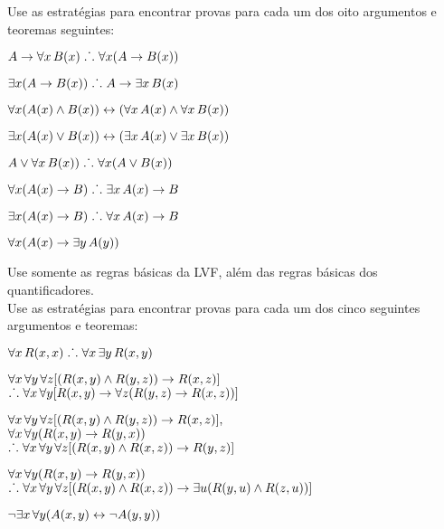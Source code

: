 \practiceproblems

\problempart
Use as estratégias  para encontrar provas para cada um dos oito argumentos e teoremas seguintes:
 
\begin{earg}
\item $A \rightarrow \forall x\,\mathord{B}(x) \mathrel{\ldotp\dot{}\,\ldotp} \forall x(A \rightarrow \mathord{B}(x))$
\item $\exists x(A \rightarrow \mathord{B}(x)) \mathrel{\ldotp\dot{}\,\ldotp} A \rightarrow \exists x\, \mathord{B}(x)$
\item $\forall x(\mathord{A}(x) \wedge \mathord{B}(x)) \leftrightarrow (\forall x\,\mathord{A}(x) \wedge \forall x\,\mathord{B}(x))$
\item $\exists x(\mathord{A}(x) \vee \mathord{B}(x)) \leftrightarrow (\exists x\,\mathord{A}(x) \vee \exists x\,\mathord{B}(x))$
\item $A \vee \forall x\,\mathord{B}(x)) \mathrel{\ldotp\dot{}\,\ldotp} \forall x(A \vee \mathord{B}(x))$
\item $\forall x(\mathord{A}(x) \rightarrow B) \mathrel{\ldotp\dot{}\,\ldotp} \exists x\,\mathord{A}(x) \rightarrow B$
\item $\exists x(\mathord{A}(x) \rightarrow B) \mathrel{\ldotp\dot{}\,\ldotp} \forall x\,\mathord{A}(x) \rightarrow B$
\item $\forall x(\mathord{A}(x) \rightarrow \exists y\,\mathord{A}(y))$
\end{earg}
Use somente as regras básicas da LVF, além das regras básicas dos quantificadores.\\

\problempart
Use as estratégias para encontrar provas para cada um dos cinco seguintes argumentos e teoremas:
\begin{earg}
\item $\forall x\,\mathord{R}(x,x) \mathrel{\ldotp\dot{}\,\ldotp} \forall x\,\exists y\,\mathord{R}(x,y)$
\item $\forall x\,\forall y\,\forall z[(\mathord{R}(x,y) \wedge \mathord{R}(y,z)) \rightarrow \mathord{R}(x,z)]$ \\
$\mathrel{\ldotp\dot{}\,\ldotp} \forall x\,\forall y[\mathord{R}(x,y) \rightarrow \forall z(\mathord{R}(y,z) \rightarrow \mathord{R}(x,z))]$
\item $\forall x\,\forall y\,\forall z[(\mathord{R}(x,y) \wedge \mathord{R}(y,z)) \rightarrow \mathord{R}(x,z)],$\\ $\forall x\,\forall y(\mathord{R}(x,y) \rightarrow \mathord{R}(y, x))$ \\ $\mathrel{\ldotp\dot{}\,\ldotp} \forall x\,\forall y\,\forall z[(\mathord{R}(x,y) \wedge \mathord{R}(x,z)) \rightarrow \mathord{R}(y,z)]$
\item $\forall x\,\forall y(\mathord{R}(x,y) \rightarrow \mathord{R}(y, x))$ \\$\mathrel{\ldotp\dot{}\,\ldotp} \forall x\,\forall y\,\forall z[(\mathord{R}(x,y) \wedge \mathord{R}(x,z)) \rightarrow \exists u(\mathord{R}(y,u) \wedge \mathord{R}(z,u))]$
\item $\neg \exists x\,\forall y (\mathord{A}(x, y) \leftrightarrow \lnot\mathord{A}(y, y))$
\end{earg}

